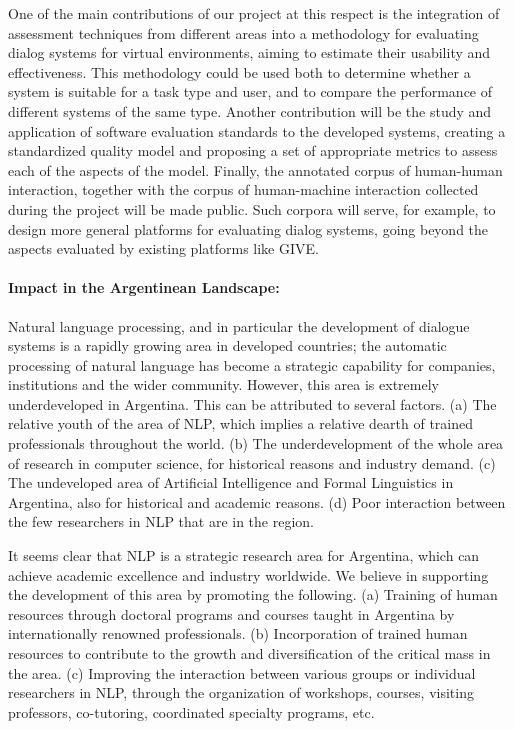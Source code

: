 One of the main contributions of our project at this respect is the
integration of assessment techniques from different areas into a methodology for
evaluating dialog systems for virtual environments, aiming to estimate their
usability and effectiveness. This methodology could be used both to determine
whether a system is suitable for a task type and user, and to compare the
performance of different systems of the same type.
Another contribution will be the study and application of software evaluation standards
to the developed systems, creating a standardized quality model and proposing
a set of appropriate metrics to assess each of the aspects of the model. 
Finally, the annotated corpus of human-human interaction, together with the corpus of
human-machine interaction collected during the project will be made public. Such
corpora will serve, for example, to design more general platforms for evaluating
dialog systems, going beyond the aspects evaluated by existing
platforms like GIVE.

\paragraph{Impact in the Argentinean Landscape:} 
Natural language processing, and in particular the development of dialogue
systems is a rapidly growing area in developed countries; the automatic
processing of natural language has become a strategic capability for companies,
institutions and the wider community. However, this area is extremely
underdeveloped in Argentina. This can be attributed to several factors. (a) The
relative youth of the area of NLP, which implies a relative dearth of trained
professionals throughout the world. (b) The underdevelopment of the whole area
of research in computer science, for historical reasons and industry demand. (c)
The undeveloped area of Artificial Intelligence and Formal Linguistics in
Argentina, also for historical and academic reasons. (d) Poor interaction
between the few researchers in NLP that are in the region. 

It seems clear that NLP is a strategic research area for Argentina, which can
achieve academic excellence and industry worldwide. We believe in supporting the
development of this area by promoting the following. (a) Training of human
resources through doctoral programs and courses taught in Argentina by
internationally renowned professionals. (b) Incorporation of trained human
resources to contribute to the growth and diversification of the critical mass
in the area. (c) Improving the interaction between various groups or
individual researchers in NLP, through the organization of workshops, courses,
visiting professors, co-tutoring, coordinated specialty programs, etc.


